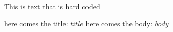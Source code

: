 \documentclass{article}
\begin{document}
This is text that is hard coded

here comes the title: $title$
here comes the body: $body$
\end{document}
